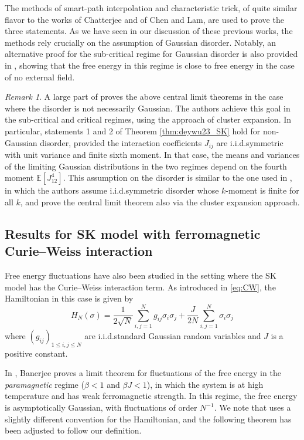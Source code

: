 \documentclass[11pt]{article}
\numberwithin{equation}{section}
\def \b {\beta}
\def \s {\sigma}
\newcommand{\bE}{\mathbb{E}}
\theoremstyle{remark}
\newtheorem{remark}[theorem]{Remark}
\begin{document}
The methods of smart-path interpolation and characteristic trick, of quite similar flavor to the works \cites{Chatterjee09, Chatterjee2014book, Chatterjee19} of Chatterjee and \cite{ChenLam19} of Chen and Lam, are used to prove the three statements. As we have seen in our discussion of these previous works, the methods rely crucially on the assumption of Gaussian disorder. Notably, an alternative proof for the sub-critical regime for Gaussian disorder
is also provided in \cite{DeyWu23}, showing that the free energy in this regime is close to free energy in the case of no external field. 

\begin{remark}\label{rmk:nongaussian}
    A large part of \cite{DeyWu23} proves the above central limit theorems in the case where the disorder is not necessarily Gaussian. The authors achieve this goal in the sub-critical and critical regimes, using the approach of cluster expansion. In particular, statements 1 and 2 of Theorem \ref{thm:deywu23_SK} hold for non-Gaussian disorder, provided the interaction coefficients $J_{ij}$ are i.i.d.\@ symmetric with unit variance and finite sixth moment. In that case, the means and variances of the limiting Gaussian distributions in the two regimes depend on the fourth moment $\bE[J_{12}^4]$. This assumption on the disorder is similar to the one used in \cite{AizenmanLebowitzRuelle}, in which the authors assume i.i.d.\@ symmetric disorder whose $k$-moment is finite for all $k$, and prove the central limit theorem also via the cluster expansion approach.
\end{remark}

\subsection{Results for SK model with ferromagnetic Curie--Weiss interaction}

Free energy fluctuations have also been studied in the setting where the SK model has the Curie--Weiss interaction term. As introduced in \eqref{eq:CW}, the Hamiltonian in this case is given by
    \[
    H_N(\s) = \frac{1}{2\sqrt{N}}\sum_{i,j=1}^N g_{ij}\s_i \s_j + \frac{J}{2N}\sum_{i,j=1}^N \s_i\s_j
    \]
where $(g_{ij})_{1\leq i, j \leq N}$ are i.i.d.\@ standard Gaussian random variables and $J$ is a positive constant. 

In \cite{Banerjee2020}, Banerjee proves a limit theorem for fluctuations of the free energy in the \textit{paramagnetic} regime ($\b<1$ and $\b J <1$), in which the system is at high temperature and has weak ferromagnetic strength. In this regime, the free energy is asymptotically Gaussian, with fluctuations of order $N^{-1}$. We note that \cite{Banerjee2020} uses a slightly different convention for the Hamiltonian, and the following theorem has been adjusted to follow our definition. 
\end{document}
